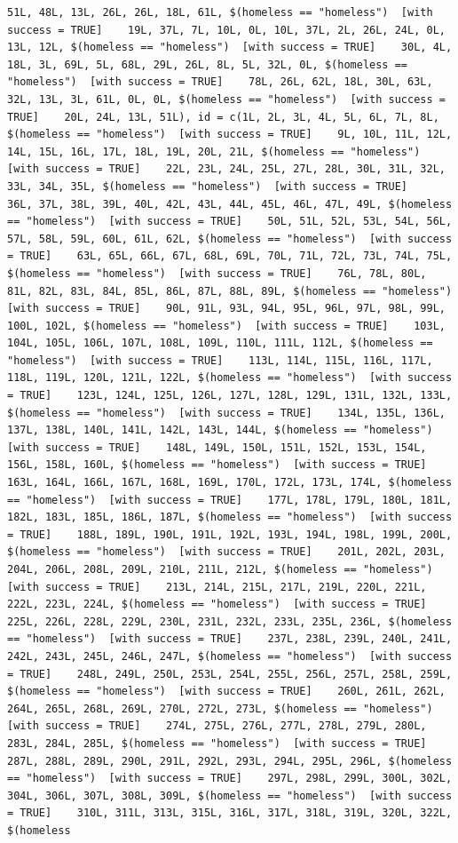 \documentclass{tufte-book}\usepackage[]{graphicx}\usepackage[]{xcolor}
\makeatletter
\newenvironment{kframe}{%
 \def\at@end@of@kframe{}%
 \ifinner\ifhmode%
  \def\at@end@of@kframe{\end{minipage}}%
  \begin{minipage}{\columnwidth}%
 \fi\fi%
 \def\FrameCommand##1{\hskip\@totalleftmargin \hskip-\fboxsep
 \colorbox{shadecolor}{##1}\hskip-\fboxsep
     \hskip-\linewidth \hskip-\@totalleftmargin \hskip\columnwidth}%
 \MakeFramed {\advance\hsize-\width
   \@totalleftmargin\z@ \linewidth\hsize
   \@setminipage}}%
 {\par\unskip\endMakeFramed%
 \at@end@of@kframe}
\newenvironment{knitrout}{}{} %
\makeatother
\begin{document}
\begin{knitrout}
\begin{kframe}
\begin{verbatim}
51L, 48L, 13L, 26L, 26L, 18L, 61L, $(homeless == "homeless")  [with success = TRUE]    19L, 37L, 7L, 10L, 0L, 10L, 37L, 2L, 26L, 24L, 0L, 13L, 12L, $(homeless == "homeless")  [with success = TRUE]    30L, 4L, 18L, 3L, 69L, 5L, 68L, 29L, 26L, 8L, 5L, 32L, 0L, $(homeless == "homeless")  [with success = TRUE]    78L, 26L, 62L, 18L, 30L, 63L, 32L, 13L, 3L, 61L, 0L, 0L, $(homeless == "homeless")  [with success = TRUE]    20L, 24L, 13L, 51L), id = c(1L, 2L, 3L, 4L, 5L, 6L, 7L, 8L, $(homeless == "homeless")  [with success = TRUE]    9L, 10L, 11L, 12L, 14L, 15L, 16L, 17L, 18L, 19L, 20L, 21L, $(homeless == "homeless")  [with success = TRUE]    22L, 23L, 24L, 25L, 27L, 28L, 30L, 31L, 32L, 33L, 34L, 35L, $(homeless == "homeless")  [with success = TRUE]    36L, 37L, 38L, 39L, 40L, 42L, 43L, 44L, 45L, 46L, 47L, 49L, $(homeless == "homeless")  [with success = TRUE]    50L, 51L, 52L, 53L, 54L, 56L, 57L, 58L, 59L, 60L, 61L, 62L, $(homeless == "homeless")  [with success = TRUE]    63L, 65L, 66L, 67L, 68L, 69L, 70L, 71L, 72L, 73L, 74L, 75L, $(homeless == "homeless")  [with success = TRUE]    76L, 78L, 80L, 81L, 82L, 83L, 84L, 85L, 86L, 87L, 88L, 89L, $(homeless == "homeless")  [with success = TRUE]    90L, 91L, 93L, 94L, 95L, 96L, 97L, 98L, 99L, 100L, 102L, $(homeless == "homeless")  [with success = TRUE]    103L, 104L, 105L, 106L, 107L, 108L, 109L, 110L, 111L, 112L, $(homeless == "homeless")  [with success = TRUE]    113L, 114L, 115L, 116L, 117L, 118L, 119L, 120L, 121L, 122L, $(homeless == "homeless")  [with success = TRUE]    123L, 124L, 125L, 126L, 127L, 128L, 129L, 131L, 132L, 133L, $(homeless == "homeless")  [with success = TRUE]    134L, 135L, 136L, 137L, 138L, 140L, 141L, 142L, 143L, 144L, $(homeless == "homeless")  [with success = TRUE]    148L, 149L, 150L, 151L, 152L, 153L, 154L, 156L, 158L, 160L, $(homeless == "homeless")  [with success = TRUE]    163L, 164L, 166L, 167L, 168L, 169L, 170L, 172L, 173L, 174L, $(homeless == "homeless")  [with success = TRUE]    177L, 178L, 179L, 180L, 181L, 182L, 183L, 185L, 186L, 187L, $(homeless == "homeless")  [with success = TRUE]    188L, 189L, 190L, 191L, 192L, 193L, 194L, 198L, 199L, 200L, $(homeless == "homeless")  [with success = TRUE]    201L, 202L, 203L, 204L, 206L, 208L, 209L, 210L, 211L, 212L, $(homeless == "homeless")  [with success = TRUE]    213L, 214L, 215L, 217L, 219L, 220L, 221L, 222L, 223L, 224L, $(homeless == "homeless")  [with success = TRUE]    225L, 226L, 228L, 229L, 230L, 231L, 232L, 233L, 235L, 236L, $(homeless == "homeless")  [with success = TRUE]    237L, 238L, 239L, 240L, 241L, 242L, 243L, 245L, 246L, 247L, $(homeless == "homeless")  [with success = TRUE]    248L, 249L, 250L, 253L, 254L, 255L, 256L, 257L, 258L, 259L, $(homeless == "homeless")  [with success = TRUE]    260L, 261L, 262L, 264L, 265L, 268L, 269L, 270L, 272L, 273L, $(homeless == "homeless")  [with success = TRUE]    274L, 275L, 276L, 277L, 278L, 279L, 280L, 283L, 284L, 285L, $(homeless == "homeless")  [with success = TRUE]    287L, 288L, 289L, 290L, 291L, 292L, 293L, 294L, 295L, 296L, $(homeless == "homeless")  [with success = TRUE]    297L, 298L, 299L, 300L, 302L, 304L, 306L, 307L, 308L, 309L, $(homeless == "homeless")  [with success = TRUE]    310L, 311L, 313L, 315L, 316L, 317L, 318L, 319L, 320L, 322L, $(homeless 
\end{verbatim}
\end{kframe}
\end{knitrout}
\end{document}
